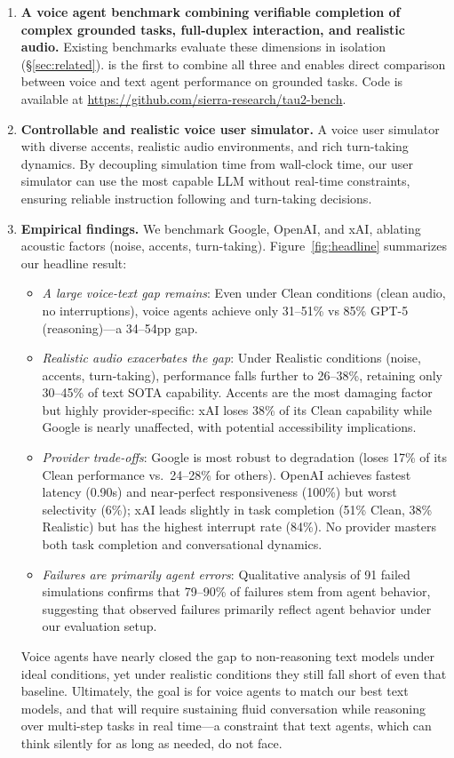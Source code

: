 \begin{enumerate}
    \item \textbf{A voice agent benchmark combining verifiable completion of complex grounded tasks, full-duplex interaction, and realistic audio.} Existing benchmarks evaluate these dimensions in isolation (\S\ref{sec:related}). \tauvoice{} is the first to combine all three and enables direct comparison between voice and text agent performance on grounded tasks. Code is available at \url{https://github.com/sierra-research/tau2-bench}.
    
    \item \textbf{Controllable and realistic voice user simulator.} A voice user simulator with diverse accents, realistic audio environments, and rich turn-taking dynamics. By decoupling simulation time from wall-clock time, our user simulator can use the most capable LLM without real-time constraints, ensuring reliable instruction following and turn-taking decisions.
    
    \item \textbf{Empirical findings.} We benchmark Google, OpenAI, and xAI, ablating acoustic factors (noise, accents, turn-taking). Figure~\ref{fig:headline} summarizes our headline result:
    \begin{itemize}[nosep,leftmargin=1em]
        \item \textit{A large voice-text gap remains}: Even under Clean conditions (clean audio, no interruptions), voice agents achieve only 31--51\% vs 85\% GPT-5 (reasoning)---a 34--54pp gap.
        \item \textit{Realistic audio exacerbates the gap}: Under Realistic conditions (noise, accents, turn-taking), performance falls further to 26--38\%, retaining only 30--45\% of text SOTA capability. Accents are the most damaging factor but highly provider-specific: xAI loses 38\% of its Clean capability while Google is nearly unaffected, with potential accessibility implications.
        \item \textit{Provider trade-offs}: Google is most robust to degradation (loses 17\% of its Clean performance vs.\ 24--28\% for others). OpenAI achieves fastest latency (0.90s) and near-perfect responsiveness (100\%) but worst selectivity (6\%); xAI leads slightly in task completion (51\% Clean, 38\% Realistic) but has the highest interrupt rate (84\%). No provider masters both task completion and conversational dynamics.
        \item \textit{Failures are primarily agent errors}: Qualitative analysis of 91 failed simulations confirms that 79--90\% of failures stem from agent behavior, suggesting that observed failures primarily reflect agent behavior under our evaluation setup.
    \end{itemize}
Voice agents have nearly closed the gap to non-reasoning text models under ideal conditions, yet under realistic conditions they still fall short of even that baseline. Ultimately, the goal is for voice agents to match our best text models, and that will require sustaining fluid conversation while reasoning over multi-step tasks in real time---a constraint that text agents, which can think silently for as long as needed, do not face.
\end{enumerate}

